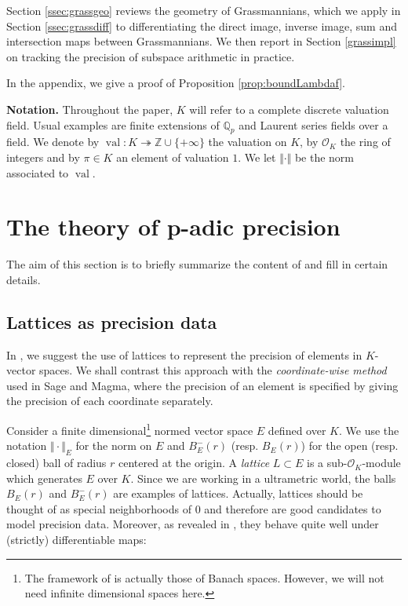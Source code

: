 \documentclass{sig-alternate}
\DeclareMathOperator{\val}{val}
\newcommand{\Z}{\mathbb Z}
\newcommand{\Q}{\mathbb Q}
\newcommand{\Qp}{\Q_p}
\renewcommand{\O}{\mathcal O}
\newcommand{\OK}{\mathcal{O}_K}
\begin{document}
Section \ref{ssec:grassgeo} reviews the geometry of Grassmannians,
which we apply in Section \ref{ssec:grassdiff} to differentiating
the direct image, inverse image, sum and intersection maps
between Grassmannians.  We then report in Section \ref{grassimpl}
on tracking the precision of subspace arithmetic in practice.

In the appendix, we give a proof of Proposition \ref{prop:boundLambdaf}.

\smallskip

\noindent
{\bf Notation.}
Throughout the paper, $K$ will refer to a complete discrete 
valuation field. Usual examples are finite extensions of $\Qp$ and 
Laurent series fields over a field. We denote by $\val : K \twoheadrightarrow \Z \cup 
\{+\infty\}$ the valuation on $K$, by 
$\OK$ the ring of integers and by $\pi \in K$ an element of valuation 
$1$. We let $\Vert \cdot \Vert$ be the norm associated to $\val$.

\section{The theory of p-adic precision}
\label{sec:theory}

The aim of this section is to briefly summarize the content of 
\cite{caruso-roe-vaccon:14a} and fill in certain details.

\subsection{Lattices as precision data}
\label{ssec:latticeprec}

In \cite{caruso-roe-vaccon:14a}, we suggest the 
use of lattices to represent the precision of elements in 
$K$-vector spaces.  We shall contrast this approach with the
\emph{coordinate-wise method} used in Sage and Magma,
where the precision of an element is specified by giving the precision
of each coordinate separately.

Consider a finite 
dimensional\footnote{The framework of \cite{caruso-roe-vaccon:14a} is 
actually those of Banach spaces. However, we will not need infinite 
dimensional spaces here.} normed vector space $E$ 
defined over $K$. We use the notation $\Vert \cdot \Vert_E$ for the norm 
on $E$ and $B^-_E(r)$ (resp. $B^{\phantom -}_E(r)$) for the open (resp. 
closed) ball of radius $r$ centered at the origin. A \emph{lattice} $L \subset 
E$ is a sub-$\O_K$-module which generates $E$ over $K$. 
Since we are working in a ultrametric world, the balls $B^{\phantom 
-}_E(r)$ and $B^-_E(r)$ are examples of lattices. Actually, lattices 
should be thought of as special neighborhoods of $0$ and therefore are good 
candidates to model precision data. Moreover, as revealed in 
\cite{caruso-roe-vaccon:14a}, they behave quite well under (strictly) 
differentiable maps:
\end{document}
